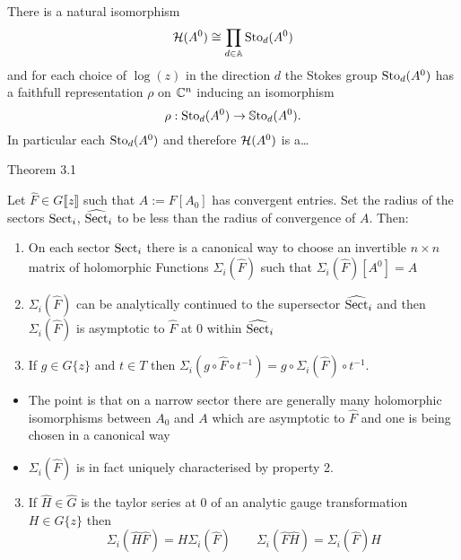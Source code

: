 \begin{frame}
  \begin{thm}
    There is a natural isomorphism
    \[
      \mathcal{H}(A^0)\cong\prod_{d\in\mathbb{A}}\operatorname{Sto}_d(A^0)
    \]
    and for each choice of $\log(z)$ in the direction $d$ the Stokes group
    $\operatorname{Sto}_d(A^0)$ has a faithfull representation $\rho$ on $\mathbb{C}^n$ inducing an
    isomorphism
    \[
      \rho:\operatorname{Sto}_d(A^0)\to\operatorname{\mathbb{S}to}_d(A^0).
    \]
    In particular each $\operatorname{Sto}_d(A^0)$ and therefore $\mathcal{H}(A^0)$ is a\dots
  \end{thm}
\end{frame}

\begin{frame}{Theorem 3.1}
  \begin{thm}
    Let $\hat{F}\in G\llbracket z\rrbracket$ such that $A:=F[A_0]$ has
    convergent entries.
    Set the radius of the sectors $\operatorname{Sect}_i$, $\widehat{\operatorname{Sect}}_i$ to be less than
    the radius of convergence of $A$.
    Then:
    \begin{enumerate}
      \item On each sector $\operatorname{Sect}_i$ there is a canonical way to choose an
        invertible $n\times n$ matrix of holomorphic Functions
        $\Sigma_i(\hat F)$ such that $\Sigma_i(\hat F)[A^0]=A$
      \item $\Sigma_i(\hat F)$ can be analytically continued to the supersector
        $\widehat{\operatorname{Sect}}_i$ and then $\Sigma_i(\hat F)$ is asymptotic to $\hat F$
        at $0$ within $\widehat{\operatorname{Sect}}_i$
      \item If $g\in G\{z\}$ and $t\in T$ then
        $\Sigma_i(g\circ\hat F \circ t^{-1})=g\circ\Sigma_i(\hat F)\circ t^{-1}$.
    \end{enumerate}
  \end{thm}
  \begin{itemize}
    \item The point is that on a narrow sector there are generally many
      holomorphic isomorphisms between $A_0$ and $A$ which are asymptotic to
      $\hat F$ and one is being chosen in a canonical way
    \item $\Sigma_i(\hat F)$ is in fact uniquely characterised by property 2.
  \end{itemize}
  \begin{prop}
    \begin{enumerate}
    \setcounter{enumi}{2}
    \item If $\hat H\in\hat G$ is the taylor series at $0$ of an analytic gauge
      transformation $H\in G\{z\}$ then
      \[
        \Sigma_i(\hat H \hat F)=H\Sigma_i(\hat F)
        \qquad
        \Sigma_i(\hat F \hat H)=\Sigma_i(\hat F)H
      \]
  \end{enumerate}
  \end{prop}
\end{frame}

